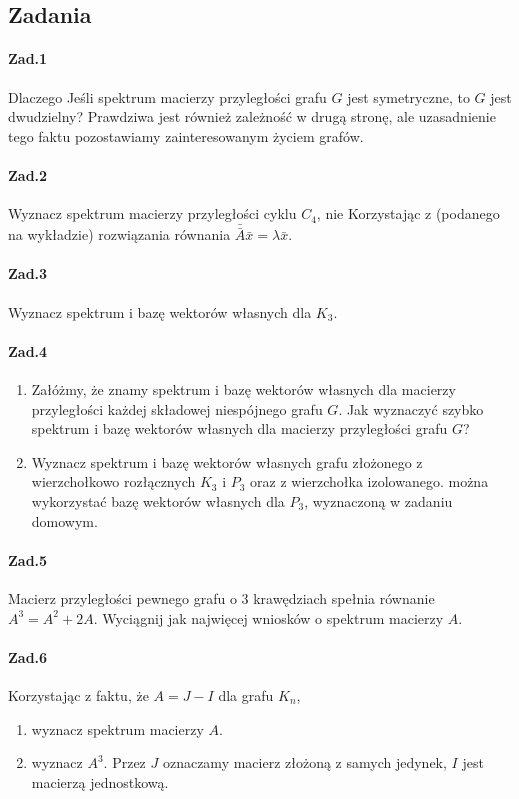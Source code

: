 \subsection{Zadania}
\paragraph{Zad.1} Dlaczego Jeśli spektrum macierzy przyległości grafu $G$ jest symetryczne, to $G$ jest dwudzielny? Prawdziwa jest również zależność w drugą stronę, ale uzasadnienie tego faktu pozostawiamy zainteresowanym życiem grafów.
\paragraph{Zad.2} Wyznacz spektrum macierzy przyległości cyklu $C_4$, nie Korzystając z (podanego na wykładzie) rozwiązania równania $\bar{\bar{A}}\bar{x} = \lambda \bar{x}$.
\paragraph{Zad.3} Wyznacz spektrum i bazę wektorów własnych dla $K_3$.
\paragraph{Zad.4}
\begin{enumerate}[label=\alph*)]
\item Załóżmy, że znamy spektrum i bazę wektorów własnych dla macierzy przyległości każdej składowej niespójnego grafu $G$. Jak wyznaczyć szybko spektrum i bazę wektorów własnych dla macierzy przyległości grafu $G$?
\item Wyznacz spektrum i bazę wektorów własnych grafu złożonego z wierzchołkowo rozłącznych $K_3$ i $P_3$ oraz z wierzchołka izolowanego. można wykorzystać bazę wektorów własnych dla $P_3$, wyznaczoną w zadaniu domowym.
\end{enumerate}

\paragraph{Zad.5} Macierz przyległości pewnego grafu o $3$ krawędziach spełnia równanie $A^3 = A^2 + 2A$. Wyciągnij jak najwięcej wniosków o spektrum macierzy $A$.
\paragraph{Zad.6} Korzystając z faktu, że $A = J - I$ dla grafu $K_n$,
\begin{enumerate}[label=\alph*)]
\item wyznacz spektrum macierzy $A$.
\item wyznacz $A^3$. Przez $J$ oznaczamy macierz złożoną z samych jedynek, $I$ jest macierzą jednostkową.
\end{enumerate}


